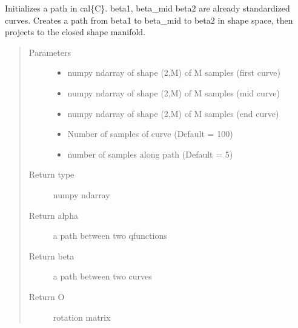 \documentclass[letterpaper,10pt,english]{sphinxmanual}
\begin{document}
\begin{fulllineitems}
\label{\detokenize{geodesic:geodesic.init_path_rand}}
Initializes a path in cal\{C\}. beta1, beta\_mid beta2 are already
standardized curves. Creates a path from beta1 to beta\_mid to beta2 in
shape space, then projects to the closed shape manifold.
\begin{quote}\begin{description}
\item[{Parameters}] \leavevmode\begin{itemize}
\item {} 
 \textendash{} numpy ndarray of shape (2,M) of M samples (first curve)

\item {} 
 \textendash{} numpy ndarray of shape (2,M) of M samples (mid curve)

\item {} 
 \textendash{} numpy ndarray of shape (2,M) of M samples (end curve)

\item {} 
 \textendash{} Number of samples of curve (Default = 100)

\item {} 
 \textendash{} number of samples along path (Default = 5)

\end{itemize}

\item[{Return type}] \leavevmode
numpy ndarray

\item[{Return alpha}] \leavevmode
a path between two q\sphinxhyphen{}functions

\item[{Return beta}] \leavevmode
a path between two curves

\item[{Return O}] \leavevmode
rotation matrix

\end{description}\end{quote}

\end{fulllineitems}
\end{document}
